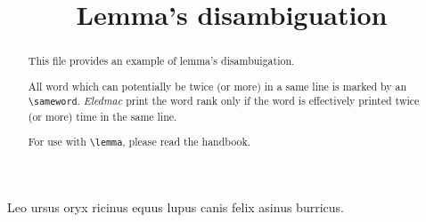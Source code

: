 \documentclass{article}
\begin{document}
\begin{english}
\date{}
\title{Lemma's disambiguation}
\maketitle


\begin{abstract}
This file provides an example of lemma's disambuigation. 

All word which can potentially be twice (or more) in a same line is marked by an \verb+\sameword+. \emph{Eledmac} print the word rank only if the word is effectively printed twice (or more) time in the same line. 

For use with \verb+\lemma+, please read the handbook.
 
\end{abstract}
\end{english}





\beginnumbering
\pstart
Leo  ursus  oryx  ricinus  equus 
lupus  canis  felix  asinus  burricus.

\pend
\endnumbering
\end{document}
